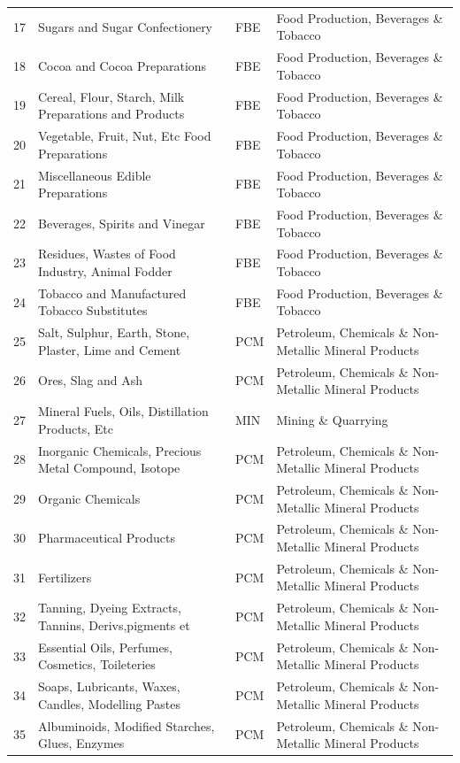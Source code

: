 \documentclass[a4paper]{article}
\begin{document}
\begin{table}[ht]
{\begin{tabular}{rlll}
  17 & Sugars and Sugar Confectionery & FBE & Food Production, Beverages \& Tobacco \\ 
  18 & Cocoa and Cocoa Preparations & FBE & Food Production, Beverages \& Tobacco \\ 
  19 & Cereal, Flour, Starch, Milk Preparations and Products & FBE & Food Production, Beverages \& Tobacco \\ 
  20 & Vegetable, Fruit, Nut, Etc Food Preparations & FBE & Food Production, Beverages \& Tobacco \\ 
  21 & Miscellaneous Edible Preparations & FBE & Food Production, Beverages \& Tobacco \\ 
  22 & Beverages, Spirits and Vinegar & FBE & Food Production, Beverages \& Tobacco \\ 
  23 & Residues, Wastes of Food Industry, Animal Fodder & FBE & Food Production, Beverages \& Tobacco \\ 
  24 & Tobacco and Manufactured Tobacco Substitutes & FBE & Food Production, Beverages \& Tobacco \\ 
  25 & Salt, Sulphur, Earth, Stone, Plaster, Lime and Cement & PCM & Petroleum, Chemicals \& Non-Metallic Mineral Products \\ 
  26 & Ores, Slag and Ash & PCM & Petroleum, Chemicals \& Non-Metallic Mineral Products \\ 
  27 & Mineral Fuels, Oils, Distillation Products, Etc & MIN & Mining \& Quarrying \\ 
  28 & Inorganic Chemicals, Precious Metal Compound, Isotope & PCM & Petroleum, Chemicals \& Non-Metallic Mineral Products \\ 
  29 & Organic Chemicals & PCM & Petroleum, Chemicals \& Non-Metallic Mineral Products \\ 
  30 & Pharmaceutical Products & PCM & Petroleum, Chemicals \& Non-Metallic Mineral Products \\ 
  31 & Fertilizers & PCM & Petroleum, Chemicals \& Non-Metallic Mineral Products \\ 
  32 & Tanning, Dyeing Extracts, Tannins, Derivs,pigments et & PCM & Petroleum, Chemicals \& Non-Metallic Mineral Products \\ 
  33 & Essential Oils, Perfumes, Cosmetics, Toileteries & PCM & Petroleum, Chemicals \& Non-Metallic Mineral Products \\ 
  34 & Soaps, Lubricants, Waxes, Candles, Modelling Pastes & PCM & Petroleum, Chemicals \& Non-Metallic Mineral Products \\ 
  35 & Albuminoids, Modified Starches, Glues, Enzymes & PCM & Petroleum, Chemicals \& Non-Metallic Mineral Products \\ 

\end{tabular}}
\end{table}
\end{document}
